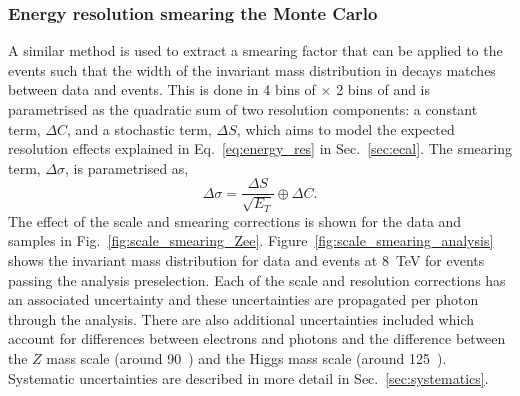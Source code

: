 \subsubsection{Energy resolution smearing the Monte Carlo}

A similar method is used to extract a smearing factor that can be applied to the \MC events such that the width of the invariant mass distribution in \Zee decays matches between data and \MC events. This is done in 4 bins of \eta $\times$ 2 bins of \rnine and is parametrised as the quadratic sum of two resolution components: a constant term, $\Delta C$, and a stochastic term, $\Delta S$, which aims to model the expected resolution effects explained in Eq.~\ref{eq:energy_res} in Sec.~\ref{sec:ecal}. The smearing term, $\Delta\sigma$, is parametrised as,
\begin{equation}
  \Delta\sigma = \frac{\Delta S}{\sqrt{E_{T}}} \oplus \Delta C.
\end{equation}
The effect of the scale and smearing corrections is shown for the \Zee data and \MC samples in Fig.~\ref{fig:scale_smearing_Zee}. Figure~\ref{fig:scale_smearing_analysis} shows the \Zee invariant mass distribution for data and \MC events at 8~TeV for events passing the analysis preselection. Each of the scale and resolution corrections has an associated uncertainty and these uncertainties are propagated per photon through the analysis. There are also additional uncertainties included which account for differences between electrons and photons and the difference between the $Z$ mass scale (around 90~\GeV) and the Higgs mass scale (around 125~\GeV). Systematic uncertainties are described in more detail in Sec.~\ref{sec:systematics}.

